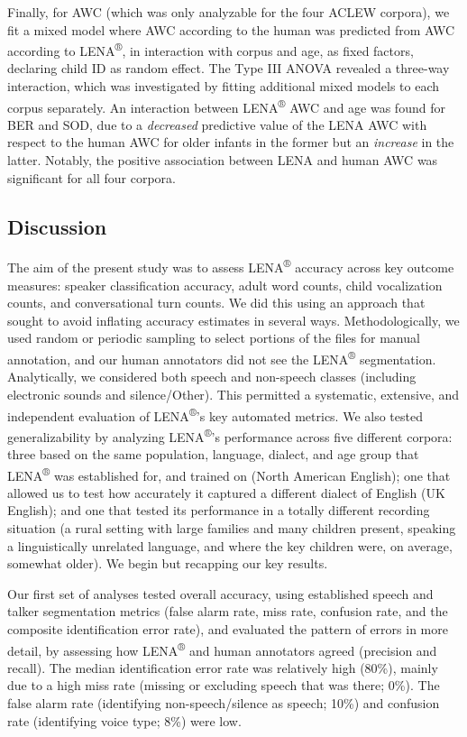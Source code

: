 \documentclass[english,table,man,floatsintext]{apa6}
\begin{document}
Finally, for AWC (which was only analyzable for the four ACLEW corpora), we fit a mixed model where AWC according to the human was predicted from AWC according to LENA\textsuperscript{®}, in interaction with corpus and age, as fixed factors, declaring child ID as random effect. The Type III ANOVA revealed a three-way interaction, which was investigated by fitting additional mixed models to each corpus separately. An interaction between LENA\textsuperscript{®} AWC and age was found for BER and SOD, due to a \emph{decreased} predictive value of the LENA AWC with respect to the human AWC for older infants in the former but an \emph{increase} in the latter. Notably, the positive association between LENA and human AWC was significant for all four corpora.

\hypertarget{discussion}{%
\subsection{Discussion}\label{discussion}}

The aim of the present study was to assess LENA\textsuperscript{®} accuracy across key outcome measures: speaker classification accuracy, adult word counts, child vocalization counts, and conversational turn counts. We did this using an approach that sought to avoid inflating accuracy estimates in several ways. Methodologically, we used random or periodic sampling to select portions of the files for manual annotation, and our human annotators did not see the LENA\textsuperscript{®} segmentation. Analytically, we considered both speech and non-speech classes (including electronic sounds and silence/Other). This permitted a systematic, extensive, and independent evaluation of LENA\textsuperscript{®}'s key automated metrics. We also tested generalizability by analyzing LENA\textsuperscript{®}'s performance across five different corpora: three based on the same population, language, dialect, and age group that LENA\textsuperscript{®} was established for, and trained on (North American English); one that allowed us to test how accurately it captured a different dialect of English (UK English); and one that tested its performance in a totally different recording situation (a rural setting with large families and many children present, speaking a linguistically unrelated language, and where the key children were, on average, somewhat older). We begin but recapping our key results.

Our first set of analyses tested overall accuracy, using established speech and talker segmentation metrics (false alarm rate, miss rate, confusion rate, and the composite identification error rate), and evaluated the pattern of errors in more detail, by assessing how LENA\textsuperscript{®} and human annotators agreed (precision and recall). The median identification error rate was relatively high (80\%), mainly due to a high miss rate (missing or excluding speech that was there; 0\%). The false alarm rate (identifying non-speech/silence as speech; 10\%) and confusion rate (identifying voice type; 8\%) were low.
\end{document}
